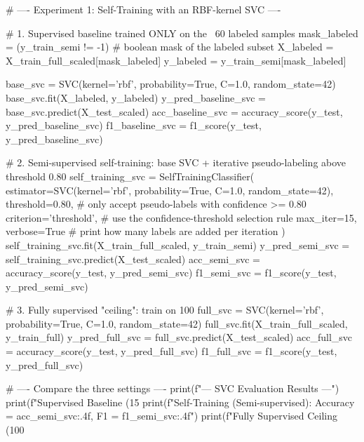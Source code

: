 \begin{codebox}[title={Experiment 1: Self-Training with an RBF-kernel SVC}]
# ---- Experiment 1: Self-Training with an RBF-kernel SVC ----

# 1. Supervised baseline trained ONLY on the ~60 labeled samples
mask_labeled = (y_train_semi != -1)                 # boolean mask of the labeled subset
X_labeled = X_train_full_scaled[mask_labeled]
y_labeled = y_train_semi[mask_labeled]

base_svc = SVC(kernel='rbf', probability=True, C=1.0, random_state=42)
base_svc.fit(X_labeled, y_labeled)
y_pred_baseline_svc = base_svc.predict(X_test_scaled)
acc_baseline_svc = accuracy_score(y_test, y_pred_baseline_svc)
f1_baseline_svc = f1_score(y_test, y_pred_baseline_svc)

# 2. Semi-supervised self-training: base SVC + iterative pseudo-labeling above threshold 0.80
self_training_svc = SelfTrainingClassifier(
    estimator=SVC(kernel='rbf', probability=True, C=1.0, random_state=42),
    threshold=0.80,          # only accept pseudo-labels with confidence >= 0.80
    criterion='threshold',   # use the confidence-threshold selection rule
    max_iter=15,
    verbose=True             # print how many labels are added per iteration
)
self_training_svc.fit(X_train_full_scaled, y_train_semi)
y_pred_semi_svc = self_training_svc.predict(X_test_scaled)
acc_semi_svc = accuracy_score(y_test, y_pred_semi_svc)
f1_semi_svc = f1_score(y_test, y_pred_semi_svc)

# 3. Fully supervised "ceiling": train on 100%
full_svc = SVC(kernel='rbf', probability=True, C=1.0, random_state=42)
full_svc.fit(X_train_full_scaled, y_train_full)
y_pred_full_svc = full_svc.predict(X_test_scaled)
acc_full_svc = accuracy_score(y_test, y_pred_full_svc)
f1_full_svc = f1_score(y_test, y_pred_full_svc)

# ---- Compare the three settings ----
print(f"\n--- SVC Evaluation Results ---")
print(f"Supervised Baseline (15%
print(f"Self-Training (Semi-supervised):   Accuracy = {acc_semi_svc:.4f}, F1 = {f1_semi_svc:.4f}")
print(f"Fully Supervised Ceiling (100%
\end{codebox}

